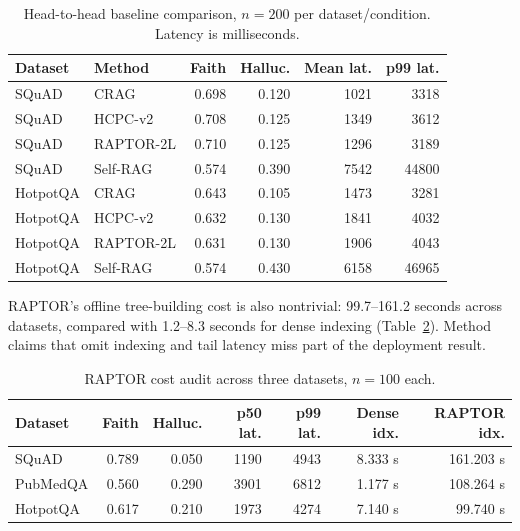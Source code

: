 \begin{table}[H]
\centering
\scriptsize
\caption{Head-to-head baseline comparison, $n=200$ per dataset/condition.
Latency is milliseconds.}
\label{tab:h2h}
\begin{tabular}{llrrrr}
\toprule
Dataset & Method & Faith & Halluc. & Mean lat. & p99 lat. \\
\midrule
SQuAD & CRAG & 0.698 & 0.120 & 1021 & 3318 \\
SQuAD & HCPC-v2 & 0.708 & 0.125 & 1349 & 3612 \\
SQuAD & RAPTOR-2L & 0.710 & 0.125 & 1296 & 3189 \\
SQuAD & Self-RAG & 0.574 & 0.390 & 7542 & 44800 \\
\midrule
HotpotQA & CRAG & 0.643 & 0.105 & 1473 & 3281 \\
HotpotQA & HCPC-v2 & 0.632 & 0.130 & 1841 & 4032 \\
HotpotQA & RAPTOR-2L & 0.631 & 0.130 & 1906 & 4043 \\
HotpotQA & Self-RAG & 0.574 & 0.430 & 6158 & 46965 \\
\bottomrule
\end{tabular}
\end{table}

RAPTOR's offline tree-building cost is also nontrivial: 99.7--161.2 seconds
across datasets, compared with 1.2--8.3 seconds for dense indexing
(Table~\ref{tab:raptorcost}). Method claims that omit indexing and tail latency
miss part of the deployment result.

\begin{table}[H]
\centering
\scriptsize
\caption{RAPTOR cost audit across three datasets, $n=100$ each.}
\label{tab:raptorcost}
\begin{tabular}{lrrrrrr}
\toprule
Dataset & Faith & Halluc. & p50 lat. & p99 lat. & Dense idx. & RAPTOR idx. \\
\midrule
SQuAD & 0.789 & 0.050 & 1190 & 4943 & 8.333 s & 161.203 s \\
PubMedQA & 0.560 & 0.290 & 3901 & 6812 & 1.177 s & 108.264 s \\
HotpotQA & 0.617 & 0.210 & 1973 & 4274 & 7.140 s & 99.740 s \\
\bottomrule
\end{tabular}
\end{table}
